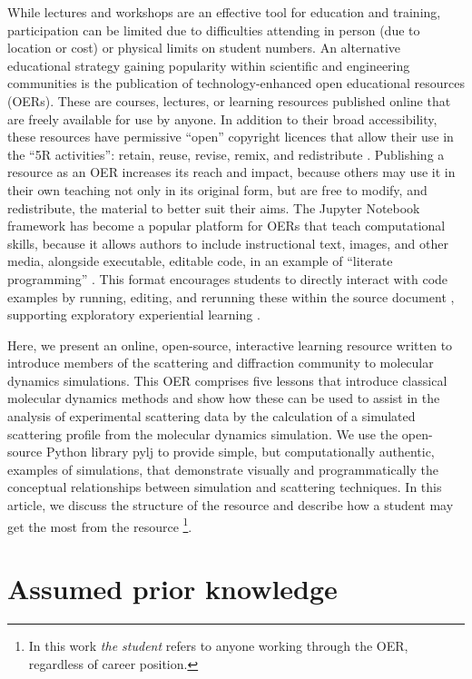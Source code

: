 \documentclass[amsmath,amssymb,twocolumn,superscriptaddress]{revtex4-1}
\begin{document}
While lectures and workshops are an effective tool for education and training, participation can be limited due to difficulties attending in person (due to location or cost) or physical limits on student numbers.
An alternative educational strategy gaining popularity within scientific and engineering communities is the publication of technology-enhanced open educational resources (OERs).
These are courses, lectures, or learning resources published online that are freely available for use by anyone. In addition to their broad accessibility, these resources have permissive ``open'' copyright licences that allow their use in the ``5R activities'': retain, reuse, revise, remix, and redistribute \cite{wiley_open_2018}.
Publishing a resource as an OER increases its reach and impact, because others may use it in their own teaching not only in its original form, but are free to modify, and redistribute, the material to better suit their aims.
The Jupyter Notebook framework \cite{kluyver_jupyter_2016} has become a popular platform for OERs that teach computational skills, because it allows authors to include instructional text, images, and other media, alongside executable, editable code, in an example of ``literate programming'' \cite{knuth_literate_1984}.
This format encourages students to directly interact with code examples by running, editing, and rerunning these within the source document \cite{barba_cybertraining_2017}, supporting exploratory experiential learning \cite{papert_mindstroms_1993}.

Here, we present an online, open-source, interactive learning resource written to introduce members of the scattering and diffraction community to molecular dynamics simulations.
This OER comprises five lessons that introduce classical molecular dynamics methods and show how these can be used to assist in the analysis of experimental scattering data by the calculation of a simulated scattering profile from the molecular dynamics simulation.
We use the open-source Python library pylj \cite{mccluskey_pylj_2018,mccluskey_arm61/pylj_2019-2} to provide simple, but computationally authentic, examples of simulations, that demonstrate visually and programmatically the conceptual relationships between simulation and scattering techniques.
In this article, we discuss the structure of the resource and describe how a student may get the most from the resource \footnote{In this work \emph{the student} refers to anyone working through the OER, regardless of career position.}.

\section{Assumed prior knowledge}
\end{document}
